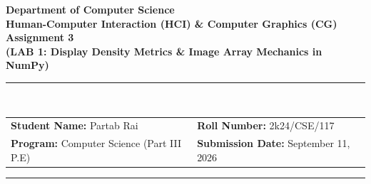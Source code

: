 \documentclass[12pt,a4paper]{article}
\begin{document}
\begin{center}
    {\large \textbf{Department of Computer Science}} \\
    {\large \textbf{Human-Computer Interaction (HCI) \& Computer Graphics (CG)}} \\[12pt]
    
    {\Huge \textbf{Assignment 3}} \\[6pt]
    {\Large \textbf{(LAB 1: Display Density Metrics \& Image Array Mechanics in NumPy)}} \\[14pt]
    
    \rule{\textwidth}{0.8pt} \\[10pt]
    
    \begin{tabular}{ll}
        \textbf{Student Name:} Partab Rai & \textbf{Roll Number:} 2k24/CSE/117 \\
        \textbf{Program:} Computer Science (Part III P.E) & \textbf{Submission Date:} September 11, 2026
    \end{tabular}
    
    \rule{\textwidth}{0.8pt}
\end{center}

\vspace{1.5em}
\end{document}
